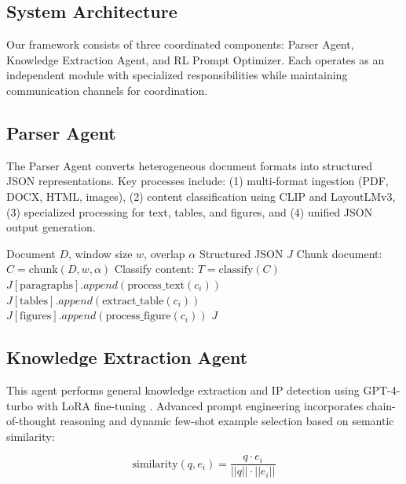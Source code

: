 \documentclass[11pt,a4paper]{article}
\begin{document}
\subsection{System Architecture}

Our framework consists of three coordinated components: Parser Agent, Knowledge Extraction Agent, and RL Prompt Optimizer. Each operates as an independent module with specialized responsibilities while maintaining communication channels for coordination.

\subsection{Parser Agent}

The Parser Agent converts heterogeneous document formats into structured JSON representations. Key processes include: (1) multi-format ingestion (PDF, DOCX, HTML, images), (2) content classification using CLIP \citep{radford2021learning} and LayoutLMv3, (3) specialized processing for text, tables, and figures, and (4) unified JSON output generation.

\begin{algorithm}[H]
\caption{Document Processing Pipeline}
\begin{algorithmic}[1]
\REQUIRE Document $D$, window size $w$, overlap $\alpha$
\ENSURE Structured JSON $J$
\STATE Chunk document: $C = \text{chunk}(D, w, \alpha)$
\STATE Classify content: $T = \text{classify}(C)$
        \STATE $J[\text{paragraphs}].append(\text{process\_text}(c_i))$
        \STATE $J[\text{tables}].append(\text{extract\_table}(c_i))$
        \STATE $J[\text{figures}].append(\text{process\_figure}(c_i))$
    \ENDIF
\ENDFOR
\RETURN $J$
\end{algorithmic}
\end{algorithm}

\subsection{Knowledge Extraction Agent}

This agent performs general knowledge extraction and IP detection using GPT-4-turbo with LoRA fine-tuning \citep{hu2021lora}. Advanced prompt engineering incorporates chain-of-thought reasoning and dynamic few-shot example selection based on semantic similarity:

\begin{equation}
\text{similarity}(q, e_i) = \frac{q \cdot e_i}{||q|| \cdot ||e_i||}
\end{equation}
\end{document}
